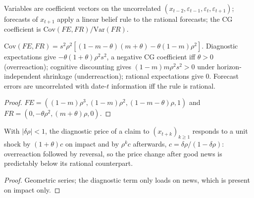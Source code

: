 \begin{definition}
\label{def:bm-de}
\leanok
Variables are coefficient vectors on the uncorrelated $(x_{t-2},\varepsilon_{t-1},\varepsilon_t,\varepsilon_{t+1})$;
forecasts of $x_{t+1}$ apply a linear belief rule to the rational forecasts; the CG coefficient is
$\mathrm{Cov}(FE,FR)/\mathrm{Var}(FR)$.
\end{definition}

\begin{theorem}
\label{thm:bm-cg}
\leanok
$\mathrm{Cov}(FE,FR)=s^2\rho^2[(1-m-\theta)(m+\theta)-\theta(1-m)\rho^2]$. Diagnostic expectations give
$-\theta(1+\theta)\rho^2s^2$, a negative CG coefficient iff $\theta>0$ (overreaction); cognitive discounting gives
$(1-m)m\rho^2s^2>0$ under horizon-independent shrinkage (underreaction); rational expectations give $0$. Forecast errors are uncorrelated with date-$t$
information iff the rule is rational.
\end{theorem}
\begin{proof}
\leanok
$FE=((1-m)\rho^3,(1-m)\rho^2,(1-m-\theta)\rho,1)$ and $FR=(0,-\theta\rho^2,(m+\theta)\rho,0)$.
\end{proof}

\begin{theorem}
\label{thm:bm-bgs-price}
\leanok
With $|\delta\rho|<1$, the diagnostic price of a claim to $(x_{t+k})_{k\ge1}$ responds to a unit shock by $(1+\theta)c$
on impact and by $\rho^kc$ afterwards, $c=\delta\rho/(1-\delta\rho)$: overreaction followed by reversal, so the price
change after good news is predictably below its rational counterpart.
\end{theorem}
\begin{proof}
\leanok
Geometric series; the diagnostic term only loads on news, which is present on impact only.
\end{proof}

